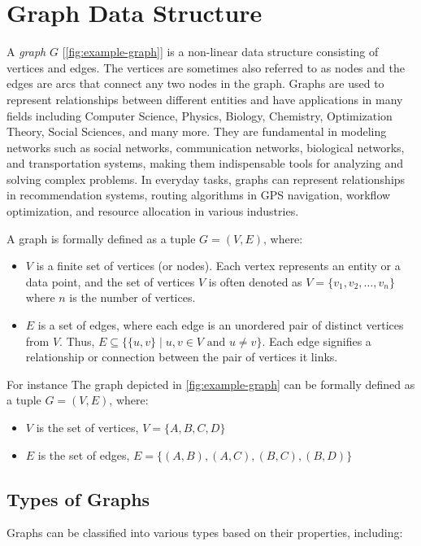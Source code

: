 \documentclass[../Thesis.tex]{subfiles}
\begin{document}
	
	\section{Graph Data Structure}
	\label{sec:graph_data_structure}
	
	A \emph{graph} $G$ [\autoref{fig:example-graph}] is a non-linear data structure consisting of vertices and edges. The vertices are sometimes also referred to as nodes and the edges are arcs that connect any two nodes in the graph. Graphs are used to represent relationships between different entities and have applications in many fields including Computer Science, Physics, Biology, Chemistry, Optimization Theory, Social Sciences, and many more. They are fundamental in modeling networks such as social networks, communication networks, biological networks, and transportation systems, making them indispensable tools for analyzing and solving complex problems. In everyday tasks, graphs can represent relationships in recommendation systems, routing algorithms in GPS navigation, workflow optimization, and resource allocation in various industries.
	
	
	
	A graph is formally defined as a tuple $G = (V, E)$, where:
	\begin{itemize}
		\item $V$ is a finite set of vertices (or nodes). Each vertex represents an entity or a data point, and the set of vertices $V$ is often denoted as $V = \{v_1, v_2, \ldots, v_n\}$ where $n$ is the number of vertices.
		\item $E$ is a set of edges, where each edge is an unordered pair of distinct vertices from $V$. Thus, $E \subseteq \{\{u, v\} \mid u, v \in V \text{ and } u \neq v\}$. Each edge signifies a relationship or connection between the pair of vertices it links.
	\end{itemize}
	
	For instance The graph depicted in \autoref{fig:example-graph} can be formally defined as a tuple \( G = (V, E) \), where:
	\begin{itemize}
		\item \( V \) is the set of vertices, \( V = \{A, B, C, D\} \)
		\item \( E \) is the set of edges, \( E = \{(A, B), (A, C), (B, C), (B, D)\} \)
	\end{itemize}
	
	\subsection{Types of Graphs}
	Graphs can be classified into various types based on their properties, including:
	
\end{document}
